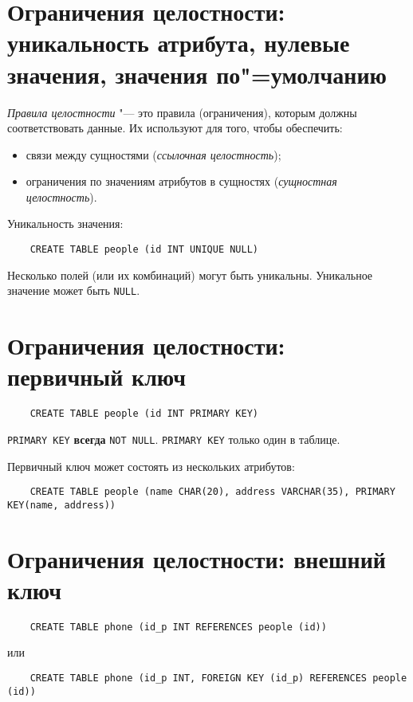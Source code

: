 \section{Ограничения целостности: уникальность атрибута, нулевые\tpst{\\}{} значения, значения по"=умолчанию}

\begin{definition}
	\emph{Правила целостности} "--- это правила (ограничения), которым должны соответствовать данные.
	Их используют для того, чтобы обеспечить:
	\begin{itemize}
		\item связи между сущностями (\emph{ссылочная целостность});
		\item ограничения по значениям атрибутов в сущностях (\emph{сущностная целостность}).
	\end{itemize}
\end{definition}

Уникальность значения:
\begin{verbatim}
	CREATE TABLE people (id INT UNIQUE NULL)
\end{verbatim}
Несколько полей (или их комбинаций) могут быть уникальны.
Уникальное значение может быть \texttt{NULL}.

\section{Ограничения целостности: первичный ключ}

\begin{verbatim}
	CREATE TABLE people (id INT PRIMARY KEY)
\end{verbatim}
\texttt{PRIMARY KEY} \textbf{всегда} \texttt{NOT NULL}.
\texttt{PRIMARY KEY} только один в таблице.

Первичный ключ может состоять из нескольких атрибутов:
\begin{verbatim}
	CREATE TABLE people (name CHAR(20), address VARCHAR(35), PRIMARY KEY(name, address))
\end{verbatim}

\section{Ограничения целостности: внешний ключ}

\begin{verbatim}
	CREATE TABLE phone (id_p INT REFERENCES people (id))
\end{verbatim}
или
\begin{verbatim}
	CREATE TABLE phone (id_p INT, FOREIGN KEY (id_p) REFERENCES people (id))
\end{verbatim}

